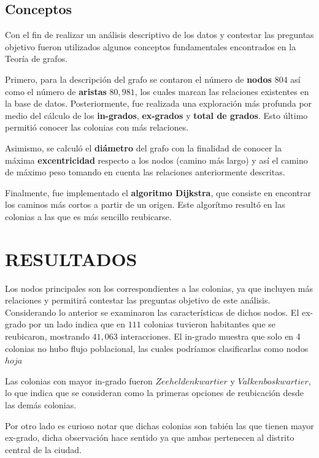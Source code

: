 \documentclass[letterpaper, 10 pt, conference]{ieeeconf}  %
\begin{document}
\subsection{Conceptos}
Con el fin de realizar un an\'alisis descriptivo de los datos y contestar las preguntas objetivo fueron utilizados algunos conceptos fundamentales encontrados en la Teor\'ia de grafos.

Primero, para la descripci\'on del grafo se contaron el n\'umero de \textbf{nodos} $804$ as\'i como el n\'umero de \textbf{aristas} $80,981$, los cuales marcan las relaciones existentes en la base de datos. Posteriormente, fue realizada una exploraci\'on m\'as profunda por medio del c\'alculo de los \textbf{in-grados}, \textbf{ex-grados} y \textbf{total de grados}. Esto \'ultimo permiti\'o conocer las colonias con m\'as relaciones.

Asimismo, se calcul\'o el \textbf{di\'ametro} del grafo con la finalidad de conocer la m\'axima \textbf{excentricidad} respecto a los nodos (camino m\'as largo) y as\'i el camino de m\'aximo peso tomando en cuenta las relaciones anteriormente descritas.

Finalmente, fue implementado el \textbf{algoritmo Dijkstra}, que consiste en encontrar los caminos m\'as cortos a partir de un origen. Este algor\'itmo result\'o en las colonias a las que es m\'as sencillo reubicarse.

\section{RESULTADOS}
\vspace{2mm}
Los nodos principales son los correspondientes a las colonias, ya que incluyen m\'as relaciones y permitir\'a contestar las preguntas objetivo de este an\'alisis. Considerando lo anterior se examinaron las caracter\'isticas de dichos nodos. El ex-grado por un lado indica que en $111$ colonias tuvieron habitantes que se reubicaron, mostrando $41,063$ interacciones. El in-grado muestra que solo en 4 colonias no hubo flujo poblacional, las cuales podr\'iamos clasificarlas como nodos $hoja$





Las colonias con mayor in-grado fueron $Zeeheldenkwartier$ y $Valkenboskwartier$, lo que indica que se consideran como la primeras opciones de reubicaci\'on desde las dem\'as colonias.

Por otro lado es curioso notar que dichas colonias son tabi\'en las que tienen mayor ex-grado, dicha observaci\'on hace sentido ya que ambas pertenecen al distrito central de la ciudad. 
\end{document}

